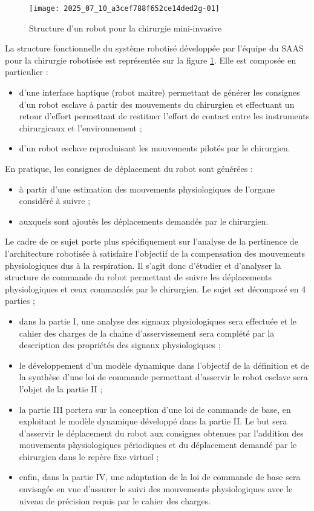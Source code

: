 \begin{figure}[!h]
\texttt{[image: 2025\_07\_10\_a3cef788f652ce14ded2g-01]}
\centering
\caption{Structure d'un robot pour la chirurgie mini-invasive\label{ccs_psi_2019_fig_01}}
\end{figure}

La structure fonctionnelle du système robotisé développée par l'équipe du SAAS pour la chirurgie robotisée est représentée sur la figure \ref{ccs_psi_2019_fig_01}. Elle est composée en particulier :

\begin{itemize}
  \item d'une interface haptique (robot maitre) permettant de générer les consignes d'un robot esclave à partir des mouvements du chirurgien et effectuant un retour d'effort permettant de restituer l'effort de contact entre les instruments chirurgicaux et l'environnement ;
  \item d'un robot esclave reproduisant les mouvements pilotés par le chirurgien.
\end{itemize}


En pratique, les consignes de déplacement du robot sont générées :
\begin{itemize}
  \item à partir d'une estimation des mouvements physiologiques de l'organe considéré à suivre ;
  \item auxquels sont ajoutés les déplacements demandés par le chirurgien.
\end{itemize}

Le cadre de ce sujet porte plus spécifiquement sur l'analyse de la pertinence de l'architecture robotisée à satisfaire l'objectif de la compensation des mouvements physiologiques dus à la respiration. Il s'agit donc d'étudier et d'analyser la structure de commande du robot permettant de suivre les déplacements physiologiques et ceux commandés par le chirurgien. Le sujet est décomposé en 4 parties ;

\begin{itemize}
  \item dans la partie I, une analyse des signaux physiologiques sera effectuée et le cahier des charges de la chaine d'asservissement sera complété par la description des propriétés des signaux physiologiques ;
  \item le développement d'un modèle dynamique dans l'objectif de la définition et de la synthèse d'une loi de commande permettant d'asservir le robot esclave sera l'objet de la partie II ;
  \item la partie III portera sur la conception d'une loi de commande de base, en exploitant le modèle dynamique développé dans la partie II. Le but sera d'asservir le déplacement du robot aux consignes obtenues par l'addition des mouvements physiologiques périodiques et du déplacement demandé par le chirurgien dans le repère fixe virtuel ;
  \item enfin, dans la partie IV, une adaptation de la loi de commande de base sera envisagée en vue d'assurer le suivi des mouvements physiologiques avec le niveau de précision requis par le cahier des charges.
\end{itemize}
\fi


